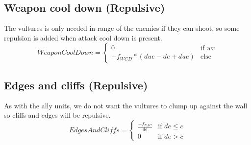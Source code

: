 	\subsection*{Weapon cool down (Repulsive)}
		The vultures is only needed in range of the enemies if they can shoot, so some repulsion is added when attack cool down is present.
		\begin{displaymath}
			WeaponCoolDown = \begin{cases}
					0 & \text{if } wr\\
					-f_{WCD} * (due - de + due) & \text{else}
				\end{cases}		
		\end{displaymath}
	\subsection*{Edges and cliffs (Repulsive)}
		As with the ally units, we do not want the vultures to clump up against the wall so cliffs and edges will be repulsive.
		\begin{displaymath}
			EdgesAndCliffs = \begin{cases}
					\frac{-f_{EAC}}{de} & \text{if } de \leq c\\
					0 & \text{if } de > c
				\end{cases}		
		\end{displaymath}
	
	